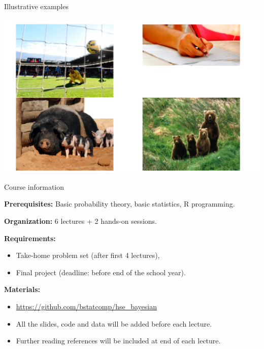 \begin{frame}{Illustrative examples}

\bigskip

\begin{center}
\includegraphics[width=0.80\linewidth]{../LectureAssets/L00/IllustrativeExamples}

\end{center}

\bigskip

\end{frame}

\begin{frame}[fragile]{Course information}

\textbf{Prerequisites:} Basic probability theory, basic statistics, R programming.

\bigskip

\textbf{Organization:} 6 lectures + 2 hands-on sessions.

\bigskip

\textbf{Requirements:}

\begin{itemize}
\item Take-home problem set (after first 4 lectures),
\item Final project (deadline: before end of the school year).
\end{itemize}

\bigskip

\textbf{Materials:}

\begin{itemize}
\item \url{https://github.com/bstatcomp/hse_bayesian}
\item All the slides, code and data will be added before each lecture.
\item Further reading references will be included at end of each lecture.
\end{itemize}

\bigskip

\end{frame}


